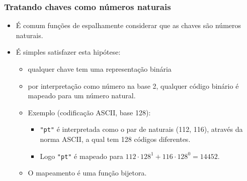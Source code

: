 \documentclass{beamer}
\begin{document}
\begin{frame}

  \frametitle{Tratando chaves como números naturais}

  \begin{itemize}

    \item É comum funções de espalhamente considerar que as chaves são números naturais.

    \item É simples satisfazer esta hipótese:

      \begin{itemize}

        \item qualquer chave tem uma representação binária

        \item por interpretação como número na base 2, qualquer código binário é
          mapeado  para um número natural.

        \item Exemplo (codificação ASCII, base 128): 

          \begin{itemize}

            \item \texttt{"pt"} é interpretada como o par de naturais (112, 116), através da norma ASCII,
              a qual tem 128 códigos diferentes.

            \item Logo \texttt{"pt"} é mapeado para $112 \cdot 128^1 + 116 \cdot 128^0 = 14452$.

          \end{itemize}

          \item O mapeamento é uma função bijetora.
      \end{itemize}

  \end{itemize}

\end{frame}
\end{document}
